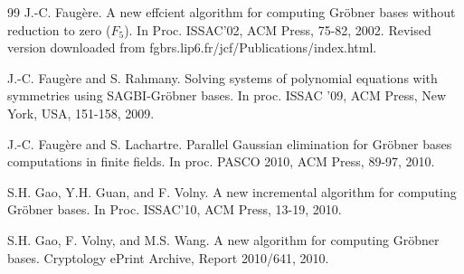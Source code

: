 \documentclass[final, number, 3p,12pt]{elsarticle}
\begin{document}
\begin{thebibliography}{99}
J.-C. Faug\`ere. A new effcient algorithm for computing Gr\"obner bases without reduction to zero ($F_5$). In Proc. ISSAC'02, ACM Press, 75-82, 2002. Revised version downloaded from fgbrs.lip6.fr/jcf/Publications/index.html.




J.-C. Faug\`ere and S. Rahmany. Solving systems of polynomial equations with symmetries using SAGBI-Gr\"obner bases. In proc. ISSAC '09, ACM Press, New York, USA, 151-158, 2009. 


J.-C. Faug\`ere and S. Lachartre. Parallel Gaussian elimination for Gr\"obner bases computations in finite fields. In proc. PASCO 2010, ACM Press, 89-97, 2010.



S.H. Gao, Y.H. Guan, and F. Volny. A new incremental algorithm for computing Gr\"obner bases. In Proc. ISSAC'10, ACM Press, 13-19, 2010.


S.H. Gao, F. Volny, and M.S. Wang. A new algorithm for computing Gr\"obner bases. Cryptology ePrint Archive, Report 2010/641, 2010.







\end{thebibliography}
\end{document}
